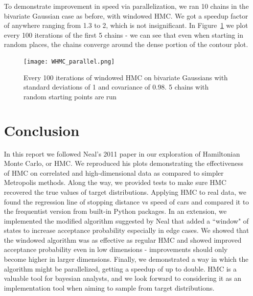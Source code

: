 \documentclass{article}
\numberwithin{equation}{section}
\begin{document}
To demonstrate improvement in speed via parallelization, we ran 10 chains in the bivariate Gaussian case as before, with windowed HMC. We got a speedup factor of anywhere ranging from 1.3 to 2, which is not insignificant. In Figure~\ref{parallel} we plot every 100 iterations of the first 5 chains - we can see that even when starting in random places, the chains converge around the dense portion of the contour plot.

\begin{figure}[H]
\centering
  \texttt{[image: WHMC\_parallel.png]}
  \caption{Every 100 iterations of windowed HMC on bivariate Gaussians with standard deviations of 1 and covariance of 0.98.  5 chains with random starting points are run}
\label{parallel}
\end{figure}

\section{Conclusion}
In this report we followed Neal's 2011 paper \cite{main} in our exploration of Hamiltonian Monte Carlo, or HMC. We reproduced his plots demonstrating the effectiveness of HMC on correlated and high-dimensional data as compared to simpler Metropolis methods. Along the way, we provided tests to make sure HMC recovered the true values of target distributions. Applying HMC to real data, we found the regression line of stopping distance vs speed of cars and compared it to the frequentist version from built-in Python packages. In an extension, we implemented the modified algorithm suggested by Neal \cite{neal_94} that added a ``window" of states to increase acceptance probability especially in edge cases. We showed that the windowed algorithm was as effective as regular HMC and showed improved acceptance probability even in low dimensions - improvements should only become higher in larger dimensions. Finally, we demonstrated a way in which the algorithm might be parallelized, getting a speedup of up to double. HMC is a valuable tool for bayesian analysts, and we look forward to considering it as an implementation tool when aiming to sample from target distributions.
\end{document}
